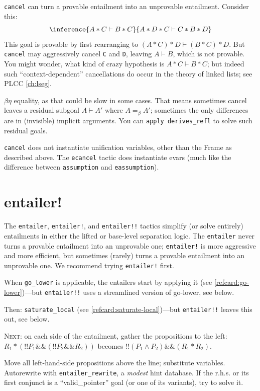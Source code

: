 \documentclass[12pt,fleqn,openany,oneside,showtrims]{memoir}
\newcommand{\ychapter}[2]{\chapter[#1]{#1}}
\begin{document}
\label{refcard:cancel-warning}
\lstinline{cancel} can turn a provable entailment
into an unprovable entailment.  Consider this:
\[\inference{A*C \vdash B*C}{A*D*C \vdash  C*B*D}\]
This goal is provable by first rearranging to
$(A*C)*D \vdash (B*C)*D$. But \lstinline{cancel}
may aggressively cancel \lstinline{C} and \lstinline{D},
leaving $A \vdash B$, which is not provable.
You might wonder, what kind of crazy hypothesis is $A*C \vdash B*C$;
but indeed such ``context-dependent'' cancellations do occur
in the theory of linked lists; see
PLCC \autoref{ch:lseg}.

 $\beta\eta$ equality,\label{cancel-beta}
as that could be slow in some cases.  That means sometimes
cancel leaves a residual subgoal $A\vdash A'$ where $A=_\beta A'$;
sometimes the only differences are in (invisible) implicit arguments.
You can \lstinline{apply derives_refl} to solve such residual goals.

  \lstinline{cancel} does not
instantiate unification variables, other than the Frame as described above.
The \lstinline{ecancel} tactic does instantiate evars
(much like the difference between \lstinline{assumption} and \lstinline{eassumption}).

\ychapter{entailer!}{(PLCC Ch.~\ref{ch:clight-auto})}
\label{refcard:entailer}
The \lstinline{entailer}, \lstinline{entailer!}, 
and \lstinline{entailer!!} tactics
simplify (or solve entirely) entailments in either the
lifted or base-level separation logic.  The \lstinline{entailer}
never turns a provable entailment into an unprovable one;
\lstinline{entailer!} is more aggressive and more efficient,
but sometimes (rarely) turns a provable entailment into an unprovable one.
We recommend trying \lstinline{entailer!} first.

When \lstinline{go_lower} is applicable, the entailers start by applying it
(see \autoref{refcard:go-lower})---but \lstinline{entailer!!}
uses a streamlined version of go-lower, see below.

Then: \lstinline{saturate_local} (see \autoref{refcard:saturate-local})---but
\lstinline{entailer!!} leaves this out, see below.

\textsc{Next:} on each side of the entailment, gather the propositions to the left:
\(
R_1 * (!!P_1 \&\& (!!P_2 \&\& R_2))\)
becomes
\(!!(P_1 \wedge P_2) \&\& (R_1 * R_2)\).

Move all left-hand-side propositions above the line; substitute variables.
Autorewrite with \lstinline{entailer_rewrite}, a \emph{modest} hint database.
If the r.h.s. or its first conjunct is a ``valid\_pointer'' goal (or one of its variants), try to solve it.
\end{document}
